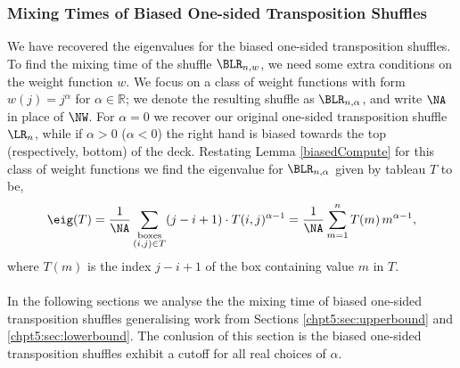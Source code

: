 \documentclass[11pt]{report}
\begin{document}
\subsubsection{Mixing Times of Biased One-sided Transposition Shuffles}

We have recovered the eigenvalues for the biased one-sided transposition shuffles. To find the mixing time of the shuffle $\BLR_{n,w}$, we need some extra conditions on the weight function $w$.
We focus on a class of weight functions with form $w(j) = 
j^{\alpha}$ for $\alpha \in \mathbb{R}$; we denote the resulting shuffle as $\BLR_{n,\alpha}$, and 
write $\NA$ in place of $\NW$. For $\alpha=0$ we recover our original one-sided 
transposition shuffle $\LR_{n}$, while if $\alpha>0$ ($\alpha<0$) the right 
hand is biased towards the top (respectively, bottom) of the deck. Restating Lemma \ref{biasedCompute} for this class of weight functions we find the eigenvalue for $\BLR_{n,\alpha}$ given by tableau $T$ to be,
\begin{eqnarray}
\eig(T) = \frac{1}{\NA}\sum_{\substack{\textnormal{boxes}\\ 
		(i,j) \in  T}} (j-i+1)\cdot T(i,j)^{\alpha-1} = \frac{1}{\NA}\sum_{m=1}^{n} 
T(m) \, m^{\alpha-1},			\label{chpt5:eqn:eigenvaluesumalpha}
\end{eqnarray}
where $T(m)$ is the index $j-i+1$ of the box containing value $m$ in $T$.

\paragraph{}
In the following sections we analyse the the mixing time of biased one-sided transposition shuffles generalising work from Sections \ref{chpt5:sec:upperbound} and \ref{chpt5:sec:lowerbound}. The conlusion of this section is the biased one-sided transposition shuffles exhibit a cutoff for all real choices of $\alpha$. 
\end{document}
